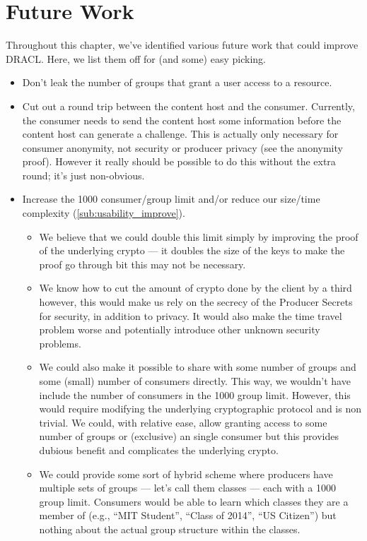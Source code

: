 \documentclass[pdftex,12pt,a4papaer,twoside,notitlepage]{report}
\begin{document}
\section{Future Work}

Throughout this chapter, we've identified various future work that could improve
DRACL. Here, we list them off for (and some) easy picking.

\begin{itemize}
\item Don't leak the number of groups that grant a user access to a resource.
\item Cut out a round trip between the content host and the consumer. Currently,
  the consumer needs to send the content host some information before the
  content host can generate a challenge. This is actually only necessary for
  consumer anonymity, not security or producer privacy (see the anonymity
  proof). However it really should be possible to do this without the extra
  round; it's just non-obvious.
\item Increase the 1000 consumer/group limit and/or reduce our size/time complexity (\ref{sub:usability_improve}).
  \begin{itemize} 
  \item We believe that we could double this limit simply by improving the proof
    of the underlying crypto --- it doubles the size of the keys to make the
    proof go through bit this may not be necessary.
  \item We know how to cut the amount of crypto done by the client by a third
    however, this would make us rely on the secrecy of the Producer Secrets for
    security, in addition to privacy. It would also make the time travel problem
    worse and potentially introduce other unknown security problems.
  \item We could also make it possible to share with some number of groups and
    some (small) number of consumers directly. This way, we wouldn't have
    include the number of consumers in the 1000 group limit. However, this would
    require modifying the underlying cryptographic protocol and is non trivial.
    We could, with relative ease, allow granting access to some number of groups
    or (exclusive) an single consumer but this provides dubious benefit and
    complicates the underlying crypto.
  \item We could provide some sort of hybrid scheme where producers have
    multiple sets of groups --- let's call them classes --- each with a 1000
    group limit. Consumers would be able to learn which classes they are a
    member of (e.g., ``MIT Student'', ``Class of 2014'', ``US Citizen'') but
    nothing about the actual group structure within the classes.
  \end{itemize}
\end{itemize}
\end{document}
